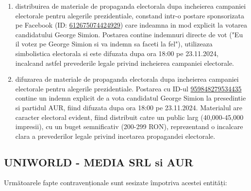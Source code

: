 \documentclass[a4paper,12pt]{article}
\begin{document}
\begin{enumerate}[leftmargin=*, label=\arabic*.)]
    \item distribuirea de materiale de propaganda electorala dupa incheierea campaniei electorale pentru alegerile prezidentiale, constand intr-o postare sponsorizata pe Facebook (ID: \href{https://www.facebook.com/ads/library/?id=612675074424929}{612675074424929}) care indeamna in mod explicit la votarea candidatului George Simion. Postarea contine indemnuri directe de vot ("Eu il votez pe George Simion si va indemn sa faceti la fel"), utilizeaza simbolistica electorala si este difuzata dupa ora 18:00 pe 23.11.2024, incalcand astfel prevederile legale privind incheierea campaniei electorale.
    \item difuzarea de materiale de propaganda electorala dupa incheierea campaniei electorale pentru alegerile prezidentiale. Postarea cu ID-ul \href{https://www.facebook.com/ads/library/?id=959848279534435}{959848279534435} contine un indemn explicit de a vota candidatul George Simion la presedintie si partidul AUR, fiind difuzata dupa ora 18:00 pe 23.11.2024. Materialul are caracter electoral evident, fiind distribuit catre un public larg (40,000-45,000 impresii), cu un buget semnificativ (200-299 RON), reprezentand o incalcare clara a prevederilor legale privind incetarea propagandei electorale.
\end{enumerate}

\vspace{0.5cm}

\subsection{UNIWORLD - MEDIA SRL si AUR}
Următoarele fapte contravenționale sunt sesizate împotriva acestei entități:
\end{document}
